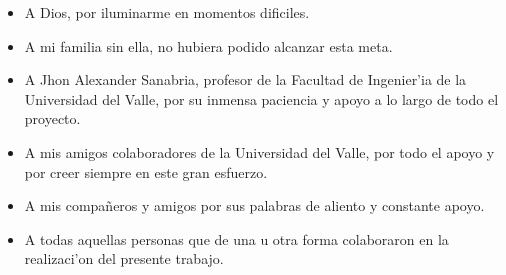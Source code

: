 
\begin{itemize}
\item A Dios, por iluminarme en momentos dificiles.
\item A mi familia sin ella, no hubiera podido alcanzar esta meta.
\item A Jhon Alexander Sanabria, profesor de la Facultad de Ingenier'ia de la Universidad del Valle, por su inmensa paciencia y apoyo a lo largo de todo el proyecto.
\item A mis amigos colaboradores de la Universidad del Valle, por todo el apoyo y por creer siempre en este gran esfuerzo.
\item A mis compañeros y amigos por sus palabras de aliento y constante apoyo.
\item A todas aquellas personas que de una u otra forma colaboraron en la realizaci'on del presente trabajo.
\end{itemize}

